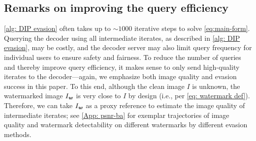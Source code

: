 \subsection{Remarks on improving the query efficiency}
\label{sec:query-effi}
\cref{alg: DIP evasion} often takes up to $\sim 1000$ iterative steps to solve \cref{eq:main-form}. Querying the decoder using all intermediate iterates, as described in \cref{alg: DIP evasion}, may be costly, and the decoder server may also limit query frequency for individual users to ensure safety and fairness. To reduce the number of queries and thereby improve query efficiency, it makes sense to only send high-quality iterates to the decoder---again, we emphasize both image quality and evasion success in this paper. To this end, although the clean image $I$ is unknown, the watermarked image $I_{\boldsymbol w}$ is very close to $I$ by design (i.e., per \cref{eq: watermark def}). Therefore, we can take $I_{\boldsymbol w}$ as a proxy reference to estimate the image quality of intermediate iterates; see \cref{App: psnr-ba} for exemplar trajectories of image quality and watermark detectability on different watermarks by different evasion methods. 